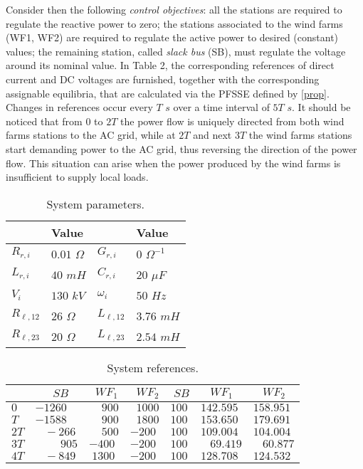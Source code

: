 \documentclass[5p,twocolumn]{elsarticle}
\numberwithin{equation}{section}
\begin{document}
Consider then the following {\em control objectives}: all the stations are required to regulate the reactive power to zero; the stations associated to the wind farms (WF1, WF2) are required to regulate the active power to desired (constant) values; the remaining station, called \textit{slack bus} (SB), must regulate the voltage around its nominal value. In Table 2, the corresponding references of direct current and DC voltages are furnished, together with the corresponding assignable equilibria, that are calculated via the PFSSE defined by \eqref{prop}. Changes in references occur every $T$ $s$ over a time interval of $5T$ $s$. It should be noticed that from $0$ to $2T$ the power flow is uniquely directed from both wind farms stations to the AC grid, while at $2T$  and next $3T$ the wind farms stations start demanding power to the AC grid, thus reversing the direction of the power flow. This situation can arise when the power produced by the wind farms is insufficient to supply local loads.
\begin{table}
\caption{System parameters.}
\label{parameters1}       \centering
\begin{tabular}{p{1cm}p{1.35cm}p{1cm}p{1.35cm}}
\hline
  & Value &   & Value \\
\hline
 $R_{r,i}$               & $0.01$ $\Omega $ & $G_{r,i}$  & $0$ $\Omega^{-1} $ \\
         $L_{r,i}$               & $40$ $mH$  & $C_{r,i}$ & $20$ $\mu F$ \\
         $V_i$                   & $130$ $kV$ &  $\omega_i$  & $50$ $Hz$ \\
         $R_{\ell,12}$           & $26$ $\Omega$ & $L_{\ell,12}$&$3.76$ $mH$\\
         $R_{\ell,23}$           & $20$ $\Omega$ & $L_{\ell,23}$&$2.54$ $mH$\\
\hline 
\end{tabular}
\end{table}
\begin{table}
\caption{System references.}
\label{desired}       \begin{tabular}{p{0.3cm}p{0.8cm}p{0.8cm}p{0.8cm}p{0.7cm}p{1cm}p{1cm}}
\hline\noalign{\smallskip}
          & $\;\;\quad SB$    &$\;\;{WF}_1$    &$\;\;{WF}_2$  &$ \;SB$ &$\;\;\;{WF}_1$ &$\;\;\;{WF}_2$\\
\hline
        $0$   &   $-1260$  & $\;\;\;\; 900$ &  $\;\; 1000$ & $100$ & $142.595$  & $158.951$ \\
        $T$ &    $-1588$ & $\;\;\;\;900$  & $\;\; 1800$ &  $100$& $153.650$  & $179.691$  \\
        $2T$&    $\;\;\;-266$ & $\;\;\;\;500$  & $-200$ & $100$ &$109.004$  & $104.004$  \\
        $3T$&    $\;\;\;\;\;\;\;\; 905$ & $-400$  & $-200$ & $100$ &$\;\;\; 69.419$  & $\;\;\;60.877$  \\
        $4T$&    $\;\;\;-849$ & $\;1300$  & $-200$ & $100$ &$128.708$  & $124.532$  \\
\hline
\end{tabular}
\end{table}
\end{document}

